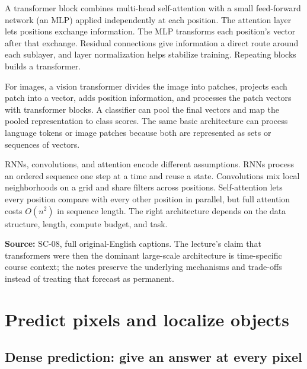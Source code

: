 A transformer block combines multi-head self-attention with a small feed-forward network (an MLP) applied independently at each position. The attention layer lets positions exchange information. The MLP transforms each position's vector after that exchange. Residual connections give information a direct route around each sublayer, and layer normalization helps stabilize training. Repeating blocks builds a transformer.

For images, a vision transformer divides the image into patches, projects each patch into a vector, adds position information, and processes the patch vectors with transformer blocks. A classifier can pool the final vectors and map the pooled representation to class scores. The same basic architecture can process language tokens or image patches because both are represented as sets or sequences of vectors.

RNNs, convolutions, and attention encode different assumptions. RNNs process an ordered sequence one step at a time and reuse a state. Convolutions mix local neighborhoods on a grid and share filters across positions. Self-attention lets every position compare with every other position in parallel, but full attention costs \(O(n^2)\) in sequence length. The right architecture depends on the data structure, length, compute budget, and task.

\textbf{Source:} SC-08, full original-English captions. The lecture's claim that transformers were then the dominant large-scale architecture is time-specific course context; the notes preserve the underlying mechanisms and trade-offs instead of treating that forecast as permanent.

\section{Predict pixels and localize objects}\label{04-visual-computing-ii-ch031-predict-pixels-and-localize-objects}

\hypertarget{04-visual-computing-ii-ch031-predict-pixels-and-localize-objects}{}

\subsection{Dense prediction: give an answer at every pixel}\label{04-visual-computing-ii-ch031-dense-prediction-give-an-answer-at-every-pixel}

\hypertarget{04-visual-computing-ii-ch031-dense-prediction-give-an-answer-at-every-pixel}{}

